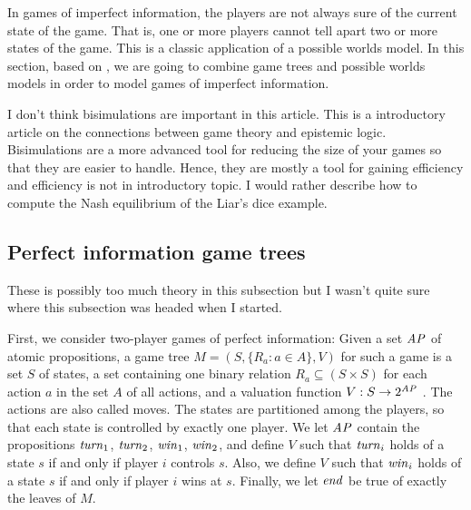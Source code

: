 In games of imperfect information, the players are not always sure of the current state of the game. That is, one or more players cannot tell apart two or more states of the game. This is a classic application of a possible worlds model. In this section, based on \cite{benthem2001a}, we are going to combine game trees and possible worlds models in order to model games of imperfect information.

{ \color{red} I don't think bisimulations are important in this article. This is a introductory article on the connections between game theory and epistemic logic. Bisimulations are a more advanced tool for reducing the size of your games so that they are easier to handle. Hence, they are mostly a tool for gaining efficiency and efficiency is not in introductory topic. I would rather describe how to compute the Nash equilibrium of the Liar's dice example. }

\subsection{Perfect information game trees} \label{seq:perfect-information}

{ \color{red} These is possibly too much theory in this subsection but I wasn't quite sure where this subsection was headed when I started. }

First, we consider two-player games of perfect information: Given a set $ \mathit{AP} $ of atomic propositions, a game tree $ M = (S, \{ R_{a} : a \in A \}, V) $ for such a game is a set $ S $ of states, a set containing one binary relation $ R_{a} \subseteq (S \times S) $ for each action $ a $ in the set $ A $ of all actions, and a valuation function $ V : S \rightarrow 2^{\mathit{AP}} $ \cite{benthem2001a}. The actions are also called moves. The states are partitioned among the players, so that each state is controlled by exactly one player. We let $ \mathit{AP} $ contain the propositions $ \mathit{turn}_{1} $, $ \mathit{turn}_{2} $, $ \mathit{win}_{1} $, $ \mathit{win}_{2} $, and define $ V $ such that $ \mathit{turn}_{i} $ holds of a state $ s $ if and only if player $ i $ controls $ s $. Also, we define $ V $ such that $ \mathit{win}_{i} $ holds of a state $ s $ if and only if player $ i $ wins at $ s $. Finally, we let $ \mathit{end} $ be true of exactly the leaves of $ M $.

